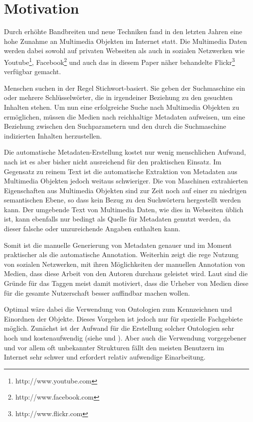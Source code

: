 \section{Motivation}
\label{sub:motivation}
Durch erhöhte Bandbreiten und neue Techniken fand in den letzten Jahren eine hohe Zunahme an Multimedia Objekten im Internet statt. Die Multimedia Daten werden dabei sowohl auf privaten Webseiten als auch in sozialen Netzwerken wie Youtube\footnote{http://www.youtube.com}, Facebook\footnote{http://www.facebook.com} und auch das in diesem Paper näher behandelte Flickr\footnote{http://www.flickr.com} verfügbar gemacht.

Menschen suchen in der Regel Stichwort-basiert. Sie geben der Suchmaschine ein oder mehrere Schlüsselwörter, die in irgendeiner Beziehung zu den gesuchten Inhalten stehen. Um nun eine erfolgreiche Suche nach Multimedia Objekten zu ermöglichen, müssen die Medien nach \cite{collectiveKnowledge} reichhaltige Metadaten aufweisen, um eine Beziehung zwischen den Suchparametern und den durch die Suchmaschine indizierten Inhalten herzustellen. 

Die automatische Metadaten-Erstellung kostet nur wenig menschlichen Aufwand, nach \cite{combiningMultipleEvidence} ist es aber bisher nicht ausreichend für den praktischen Einsatz. Im Gegensatz zu reinem Text ist die automatische Extraktion von Metadaten aus Multimedia Objekten jedoch weitaus schwieriger. Die von Maschinen extrahierten Eigenschaften aus Multimedia Objekten sind zur Zeit noch auf einer zu niedrigen semantischen Ebene, so dass kein Bezug zu den Suchwörtern hergestellt werden kann. Der umgebende Text von Multimedia Daten, wie dies in Webseiten üblich ist, kann ebenfalls nur bedingt als Quelle für Metadaten genutzt werden, da dieser falsche oder unzureichende Angaben enthalten kann.

Somit ist die manuelle Generierung von Metadaten genauer und im Moment praktischer als die automatische Annotation. Weiterhin zeigt die rege Nutzung von sozialen Netzwerken, mit ihren Möglichkeiten der manuellen Annotation von Medien, dass diese Arbeit von den Autoren durchaus geleistet wird. Laut \cite{whyWeTag} sind die Gründe für das Taggen meist damit motiviert, dass die Urheber von Medien diese für die gesamte Nutzerschaft besser auffindbar machen wollen. 

Optimal wäre dabei die Verwendung von Ontologien zum Kennzeichnen und Einordnen der Objekte. Dieses Vorgehen ist jedoch nur für spezielle Fachgebiete möglich. Zunächst ist der Aufwand für die Erstellung solcher Ontologien sehr hoch und kostenaufwendig (siehe \cite{ontology_expensive1} und \cite{ontology_expensive2}). Aber auch die Verwendung vorgegebener und vor allem oft unbekannter Strukturen fällt den meisten Benutzern im Internet sehr schwer und erfordert relativ aufwendige Einarbeitung.

